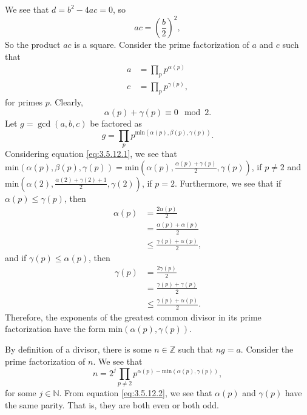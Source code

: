 \documentclass[12 pt]{amsart}
\begin{document}
  We see that $d = b^2 - 4ac = 0$, so 
  \begin{equation}
    \label{eq:3.5.12.1}
    ac = \left( \frac{b}{2} \right)^2,
  \end{equation}
  So the product $ac$ is a square.
  Consider the prime factorization of 
  $a$ and $c$ such that 
  \begin{align*}
    a &= \prod_{p} p^{\alpha(p)} \\
    c &= \prod_{p} p^{\gamma(p)},
  \end{align*}
  for primes $p$.
  Clearly, 
  \begin{equation}
    \label{eq:3.5.12.2}
    \alpha(p) + \gamma(p) \equiv 0 \mod 2.
  \end{equation}
  Let $g = \gcd(a,b,c)$ be factored as
  \[
    g = \prod_p p^{\text{min}(\alpha(p),\beta(p), \gamma(p))}. 
  \]
  Considering equation \ref{eq:3.5.12.1}, we see that
  $\text{min}(\alpha(p),\beta(p), \gamma(p)) = 
  \text{min}\left(\alpha(p),
                  \frac{\alpha(p) + \gamma(p)}{2}, \gamma(p)\right)$,
  if $p \neq 2$ and 
  $\text{min}\left(\alpha(2),
                  \frac{\alpha(2) + \gamma(2) + 1}{2}, \gamma(2)\right)$,
  if $p = 2$.
  Furthermore, we see that if 
  $\alpha(p) \leq \gamma(p)$, then 
  \begin{align*}
    \alpha(p) &= \frac{2\alpha(p)}{2} \\
              &= \frac{\alpha(p) + \alpha(p)}{2} \\
              &\leq \frac{\gamma(p) + \alpha(p)}{2},
  \end{align*}
  and if 
  $\gamma(p) \leq \alpha(p)$, then 
  \begin{align*}
    \gamma(p) &= \frac{2\gamma(p)}{2} \\
              &= \frac{\gamma(p) + \gamma(p)}{2} \\
              &\leq \frac{\gamma(p) + \alpha(p)}{2}.
  \end{align*}
  Therefore, 
  the exponents of the greatest common divisor in its
  prime factorization have the form
  $\text{min}(\alpha(p), \gamma(p))$.

  By definition of a divisor, 
  there is some $n \in \mathbb{Z}$ such that
  $ng = a$.
  Consider the prime factorization of $n$.
  We see that 
  \[
    n = 2^j \prod_{p\neq 2} p^{\alpha(p) - 
                 \text{min}\left(\alpha(p),
                            \gamma(p)\right)
                 },
  \]
  for some $j \in \mathbb{N}$.
  From equation \ref{eq:3.5.12.2}, we see that 
  $\alpha(p)$ and $\gamma(p)$ have the same parity.
  That is, they are both even or both odd. 
\end{document}
